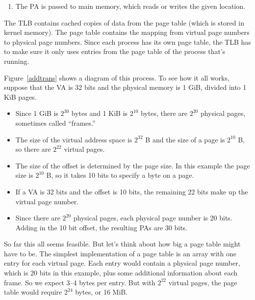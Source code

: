 \documentclass[12pt]{book}
\begin{document}
{\begin{enumerate}
\item The PA is passed to main memory, which reads or writes the given
location.

\end{enumerate}

The TLB contains cached copies of data from the page table (which is stored in kernel memory).  The page table contains the mapping from virtual page numbers to physical page numbers.  Since each process has its own page table, the TLB has to make sure it only uses entries from the page table of the process that's running.

Figure~\ref{addtrans} shows a diagram of this process.
To see how it all works, suppose that the VA is 32 bits and the physical memory is 1 GiB, divided into 1 KiB pages.

\begin{itemize}

\item Since 1 GiB is $2^{30}$ bytes and 1 KiB is $2^{10}$ bytes, there
  are $2^{20}$ physical pages, sometimes called ``frames.''

\item The size of the virtual address space is $2^{32}$ B and the size
  of a page is $2^{10}$ B, so there are $2^{22}$ virtual pages.

\item The size of the offset is determined by the page size.  In this
  example the page size is $2^{10}$ B, so it takes 10 bits to specify
  a byte on a page.

\item If a VA is 32 bits and the offset is 10 bits, the remaining
  22 bits make up the virtual page number.

\item Since there are $2^{20}$ physical pages, each physical page
  number is 20 bits.  Adding in the 10 bit offset, the resulting
  PAs are 30 bits.

\end{itemize}

So far this all seems feasible.  But let's think about how big a page
table might have to be.  The simplest implementation of a page
table is an array with one entry for each virtual page.
Each entry would contain a physical page number, which is 20 bits
in this example, plus some additional information about each
frame.  So we expect 3--4 bytes per entry.  But with $2^{22}$ virtual pages,
the page table would require $2^{24}$ bytes, or 16 MiB.

}
\end{document}
